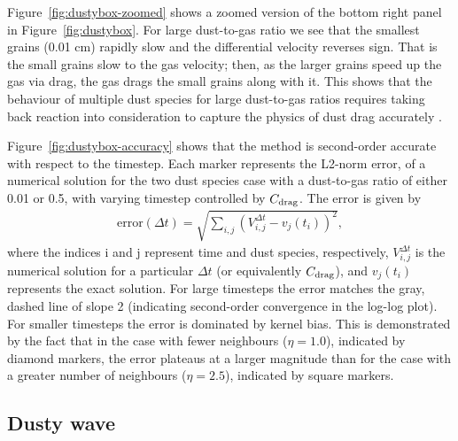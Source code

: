 \documentclass[fleqn,usenatbib]{mnras}
\begin{document}
Figure~\ref{fig:dustybox-zoomed} shows a zoomed version of the bottom right
panel in Figure~\ref{fig:dustybox}. For large dust-to-gas ratio we see that the
smallest grains (0.01 cm) rapidly slow and the differential velocity reverses
sign. That is the small grains slow to the gas velocity; then, as the larger
grains speed up the gas via drag, the gas drags the small grains along with it.
This shows that the behaviour of multiple dust species for large dust-to-gas
ratios requires taking back reaction into consideration to capture the physics
of dust drag accurately \citep{Gonzalez2017MNRAS.467.1984G,
Dipierro2018MNRAS.479.4187D}.

Figure~\ref{fig:dustybox-accuracy} shows that the method is second-order
accurate with respect to the timestep. Each marker represents the L2-norm error,
of a numerical solution for the two dust species case with a dust-to-gas ratio
of either 0.01 or 0.5, with varying timestep controlled by \(C_{\rm drag}\). The
error is given by
%
\begin{align}
   \mathrm{error}(\Delta t) = \sqrt{ \sum_{i,j}
      \left(V_{i,j}^{\Delta t} - v_{j}(t_i) \right)^2 },
\end{align}
%
where the indices i and j represent time and dust species, respectively,
\(V_{i,j}^{\Delta t}\) is the numerical solution for a particular \(\Delta t\)
(or equivalently \(C_{\rm drag}\)), and \(v_{j}(t_i)\) represents the exact
solution. For large timesteps the error matches the gray, dashed line of slope 2
(indicating second-order convergence in the log-log plot). For smaller timesteps
the error is dominated by kernel bias. This is demonstrated by the fact that in
the case with fewer neighbours (\(\eta = 1.0\)), indicated by diamond markers,
the error plateaus at a larger magnitude than for the case with a greater number
of neighbours (\(\eta = 2.5\)), indicated by square markers.

\subsection{Dusty wave}%
\label{subsec:wave}
\end{document}
